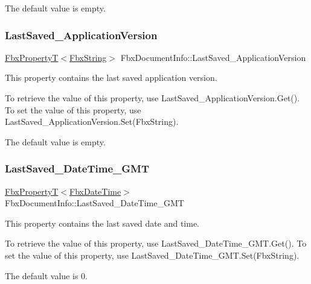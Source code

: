 The default value is empty. \mbox{\label{class_fbx_document_info_a5cffe99a205491edc2a53cf4dfe6d7ff}} 
\subsubsection{\texorpdfstring{Last\+Saved\+\_\+\+Application\+Version}{LastSaved\_ApplicationVersion}}
{\footnotesize\ttfamily \hyperlink{class_fbx_property_t}{Fbx\+PropertyT}$<$\hyperlink{class_fbx_string}{Fbx\+String}$>$ Fbx\+Document\+Info\+::\+Last\+Saved\+\_\+\+Application\+Version}

This property contains the last saved application version.

To retrieve the value of this property, use Last\+Saved\+\_\+\+Application\+Version.\+Get(). To set the value of this property, use Last\+Saved\+\_\+\+Application\+Version.\+Set(\+Fbx\+String).

The default value is empty. \mbox{\label{class_fbx_document_info_a46e21e243dfdbfed83cac11774671ac4}} 
\subsubsection{\texorpdfstring{Last\+Saved\+\_\+\+Date\+Time\+\_\+\+G\+MT}{LastSaved\_DateTime\_GMT}}
{\footnotesize\ttfamily \hyperlink{class_fbx_property_t}{Fbx\+PropertyT}$<$\hyperlink{class_fbx_date_time}{Fbx\+Date\+Time}$>$ Fbx\+Document\+Info\+::\+Last\+Saved\+\_\+\+Date\+Time\+\_\+\+G\+MT}

This property contains the last saved date and time.

To retrieve the value of this property, use Last\+Saved\+\_\+\+Date\+Time\+\_\+\+G\+M\+T.\+Get(). To set the value of this property, use Last\+Saved\+\_\+\+Date\+Time\+\_\+\+G\+M\+T.\+Set(\+Fbx\+String).

The default value is 0.

